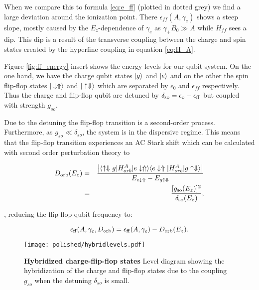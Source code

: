 
When we compare this to formula \eqref{eq:e_ff} (plotted in dotted grey) we find a large deviation around the ionization point. There $\epsilon_{ff}(A,\gamma_e)$ shows a steep slope, mostly caused by the $E_z$-dependence of $\gamma_e$ as $\gamma_+B_0\gg A$ while $H_{ff}$ sees a dip. This dip is a result of the transverse coupling between the charge and spin states created by the hyperfine coupling in equation \ref{eq:H_A}. 

Figure \ref{fig:ff_energy} insert shows the energy levels for our qubit system. On the one hand, we have the charge qubit states $|g\rangle$ and $|e\rangle$ and on the other the spin flip-flop states $|\downarrow\Uparrow\rangle$ and $|\uparrow\Downarrow\rangle$ which are separated by $\epsilon_0$ and $\epsilon_{ff}$ respectively. Thus the charge and flip-flop qubit are detuned by $\delta_{\rm so}=\epsilon_{\rm o} - \epsilon_{\rm ff}$ but coupled with strength $g_{so}$. 

Due to the detuning the flip-flop transition is a second-order process. Furthermore, as $g_{so}\ll \delta_{so}$, the system is in the dispersive regime. This means that the flip-flop transition experiences an AC Stark shift which can be calculated with second order perturbation theory to

\begin{eqnarray} \label{eq:Dorb}
D_{\rm orb}(E_z)&=&\frac{\left| \langle \uparrow\Downarrow g|H_{orb}^A|e\downarrow\Uparrow\rangle\langle e\downarrow\Uparrow|H_{orb}^A|g\uparrow\Downarrow\rangle\right|}{E_{e\downarrow\Uparrow}-E_{g\uparrow\Downarrow}}\\
&=&\frac{[g_{\rm so}(E_z)]^2}{\delta_{\rm so}(E_z)},
\end{eqnarray}

\cite{Blais2004}, reducing the flip-flop qubit frequency to:

\begin{equation} \label{eq:e_ff_ge_Dorb}
\epsilon_{\rm ff}(A,\gamma_e,D_{\rm orb})=\epsilon_{\rm ff}(A,\gamma_e)-D_{\rm orb}(E_z).
\end{equation}

\begin{figure}[h]
	\centering
	\texttt{[image: polished/hybridlevels.pdf]}
	\caption[Hybridized charge-flip-flop states]{\textbf{Hybridized charge-flip-flop states} Level diagram showing the hybridization of the charge and flip-flop states due to the coupling $g_{so}$ when the detuning $\delta_{so}$ is small.}
	\label{fig:hybridlevels}
\end{figure}

